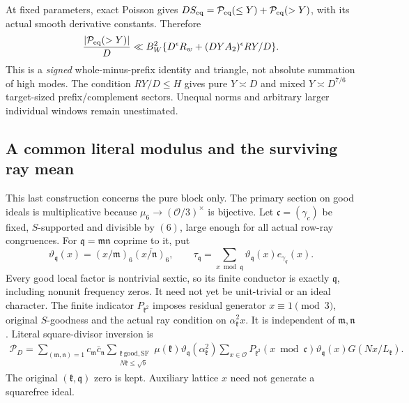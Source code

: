 At fixed parameters, exact Poisson gives
$D S_{\rm eq}=\mathcal P_{\rm eq}(\le Y)+\mathcal P_{\rm eq}(>Y)$,
with its actual smooth derivative constants. Therefore
\begin{equation}\label{cbk:equal-complement}
 \frac{|\mathcal P_{\rm eq}(>Y)|}{D}
 \ll B_W^2\{D^\epsilon R_w+(DYA_2)^\epsilon RY/D\}.
\end{equation}
This is a \emph{signed} whole-minus-prefix identity and triangle,
not absolute summation of high modes. The condition $RY/D\le H$
gives pure $Y\asymp D$ and mixed $Y\asymp D^{7/6}$ target-sized
prefix/complement sectors. Unequal norms and arbitrary larger
individual windows remain unestimated.

\subsection{A common literal modulus and the surviving ray mean}
\label{cbk:ray-proof}
This last construction concerns the pure block only. The primary
section on good ideals is multiplicative because
$\mu_6\to(\mathcal O/3)^\times$ is bijective.
Let $\mathfrak c=(\gamma_c)$ be fixed, $S$-supported and divisible
by $(6)$, large enough for all actual row-ray congruences.
For $\mathfrak q=\mathfrak m\mathfrak n$ coprime to it, put
\[
 \vartheta_{\mathfrak q}(x)=(x/\mathfrak m)_6
                     \overline{(x/\mathfrak n)_6},\qquad
 \tau_{\mathfrak q}=\sum_{x\bmod\mathfrak q}
               \vartheta_{\mathfrak q}(x)e_{\gamma_q}(x).
\]
Every good local factor is nontrivial sextic, so its finite
conductor is exactly $\mathfrak q$, including nonunit frequency
zeros. It need not yet be unit-trivial or an ideal character.
The finite indicator $P_{\mathfrak k^2}$ imposes residual generator
$x\equiv1\pmod3$, original $S$-goodness and the actual ray
condition on $\alpha_{\mathfrak k}^2x$. It is independent of
$\mathfrak m,\mathfrak n$. Literal square-divisor inversion is
\begin{equation}\label{cbk:literal-primal}
 \begin{split}
 \mathcal P_D
 =\sum_{(\mathfrak m,\mathfrak n)=1}c_{\mathfrak m}\bar c_{\mathfrak n}
 \sum_{\substack{\mathfrak k\ \mathrm{good,SF}\\N\mathfrak k\le\sqrt b}}
 \mu(\mathfrak k)\vartheta_{\mathfrak q}(\alpha_{\mathfrak k}^2)
 \sum_{x\in\mathcal O}
 P_{\mathfrak k^2}(x\bmod\mathfrak c)
          \vartheta_{\mathfrak q}(x)G(Nx/L_{\mathfrak k}).
 \end{split}
\end{equation}
The original $(\mathfrak k,\mathfrak q)$ zero is kept.
Auxiliary lattice $x$ need not generate a squarefree ideal.

